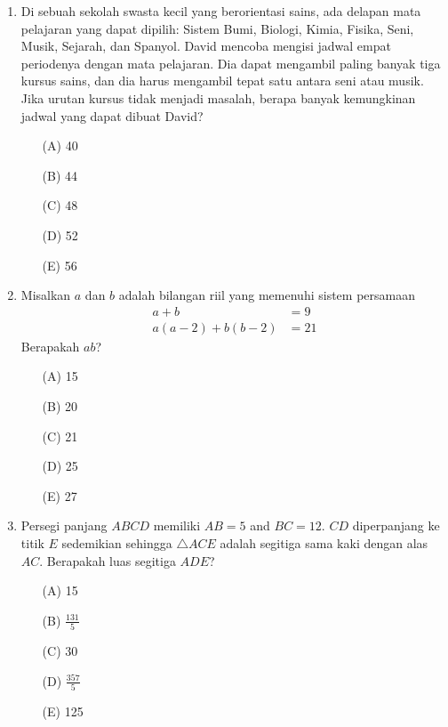 \documentclass[12pt]{scrartcl}
\begin{document}
\begin{enumerate}
    \item Di sebuah sekolah swasta kecil yang berorientasi sains, ada delapan mata pelajaran yang dapat dipilih: Sistem Bumi, Biologi, Kimia, Fisika, Seni, Musik, Sejarah, dan Spanyol. David mencoba mengisi jadwal empat periodenya dengan mata pelajaran. Dia dapat mengambil paling banyak tiga kursus sains, dan dia harus mengambil tepat satu antara seni atau musik. Jika urutan kursus tidak menjadi masalah, berapa banyak kemungkinan jadwal yang dapat dibuat David?
    \begin{itemize}
        \item[(A)] 40
        \item[(B)] 44
        \item[(C)] 48
        \item[(D)] 52
        \item[(E)] 56
    \end{itemize}

    \item Misalkan $a$ dan $b$ adalah bilangan riil yang memenuhi sistem persamaan
    \begin{align*}
    a+b &= 9 \\
    a(a-2)+b(b-2) &= 21
    \end{align*}
    Berapakah $ab$?
    \begin{itemize}
        \item[(A)] 15
        \item[(B)] 20
        \item[(C)] 21
        \item[(D)] 25
        \item[(E)] 27
    \end{itemize}

    \item Persegi panjang $ABCD$ memiliki $AB=5$ and $BC=12$. $CD$ diperpanjang ke titik $E$ sedemikian sehingga $\triangle ACE$ adalah segitiga sama kaki dengan alas $AC$. Berapakah luas segitiga $ADE$?
    \begin{itemize}
        \item[(A)] 15
        \item[(B)] $\frac{131}{5}$
        \item[(C)] 30
        \item[(D)] $\frac{357}{5}$
        \item[(E)] 125
    \end{itemize}


\end{enumerate}
\end{document}
